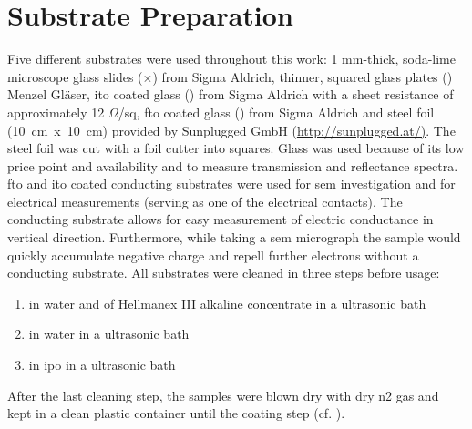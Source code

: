 \section{Substrate Preparation}
Five different substrates were used throughout this work: 
1 mm-thick, soda-lime microscope glass slides 
($\times$) from Sigma Aldrich, thinner, 
squared glass plates (\x{}) Menzel Gläser,
\gls{ito} coated glass (\x{}) from Sigma Aldrich with a sheet resistance of approximately 12 $\Omega$/sq, 
\gls{fto} coated glass (\x{}) from Sigma Aldrich and steel foil (10~cm~x~10~cm) provided by Sunplugged GmbH (\url{http://sunplugged.at/)}.
%
The steel foil was cut with a foil cutter into \x{} squares.
Glass was used because of its low price point and availability and to measure transmission and reflectance spectra. 
\Gls{fto} and \gls{ito} coated conducting substrates were used for \gls{sem} investigation and for electrical measurements (serving as one of the electrical contacts).
The conducting substrate allows for easy measurement of electric conductance in vertical direction.
Furthermore, while taking a \gls{sem} micrograph the sample would quickly accumulate negative charge and repell further electrons without a conducting substrate.
All substrates were cleaned in three steps before usage:
\begin{enumerate}
	\item {} in  \gls{water} and  of Hellmanex III alkaline concentrate in a ultrasonic bath
	\item {} in \gls{water} in a ultrasonic bath
	\item {} in \gls{ipo} in a ultrasonic bath 
\end{enumerate}
After the last cleaning step, the samples were blown dry with dry \gls{n2} gas and kept in a clean plastic container until the coating step (cf. \cite{YAMASHITA2018,Kohli2010}).

